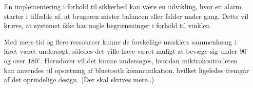 En implementering i forhold til sikkerhed kan være en udvikling, hvor en alarm starter i tilfælde af, at brugeren mister balancen eller falder under gang. Dette vil kræve, at systemet ikke har nogle begrænsninger i forhold til vinklen. 

Med mere tid og flere ressourcer kunne de forskellige musklers sammenhæng i låret været undersøgt, således det ville have været muligt at bevæge sig under $90^{\circ}$ og over $180^{\circ}$. Herudover vil det kunne undersøges, hvordan miktrokontrolleren kan anvendes til opsætning af bluetooth kommunikation, hvilket ligeledes fremgår af det oprindelige design. (Der skal skrives mere..) 




